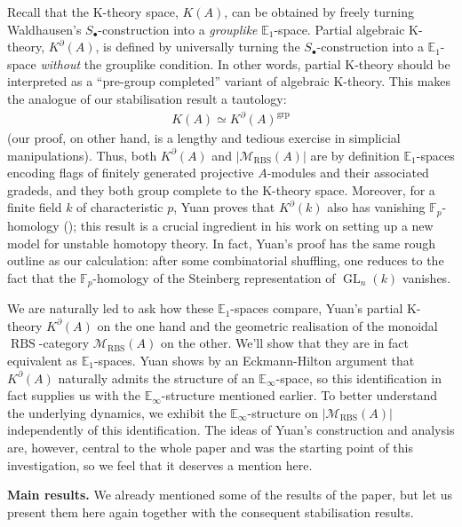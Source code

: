 \documentclass[12pt, reqno]{amsart}
\theoremstyle{plain}
\theoremstyle{definition}
\newcommand{\F}{\mathbb F}
\begin{document}
Recall that the K-theory space, $K(A)$, can be obtained by freely turning Waldhausen's $S_\bullet$-construction into a \textit{grouplike} $\mathbb{E}_1$-space. Partial algebraic K-theory, $K^\partial(A)$, is defined by universally turning the $S_\bullet$-construction into a $\mathbb{E}_1$-space \textit{without} the grouplike condition. In other words, partial K-theory should be interpreted as a ``pre-group completed'' variant of algebraic K-theory. This makes the analogue of our stabilisation result a tautology:
\begin{align*}
K(A)\simeq K^\partial(A)^{\operatorname{grp}}
\end{align*}
(our proof, on other hand, is a lengthy and tedious exercise in simplicial manipulations). Thus, both $K^\partial(A)$ and $|\mathscr{M}_{\operatorname{RBS}}(A)|$ are by definition $\mathbb{E}_1$-spaces encoding flags of finitely generated projective $A$-modules and their associated gradeds, and they both group complete to the K-theory space. Moreover, for a finite field $k$ of characteristic $p$, Yuan proves that $K^\partial(k)$ also has vanishing $\F_p$-homology (\cite[Theorem 5.2]{Yuan}); this result is a crucial ingredient in his work on setting up a new model for unstable homotopy theory. In fact, Yuan's proof has the same rough outline as our calculation: after some combinatorial shuffling, one reduces to the fact that the $\F_p$-homology of the Steinberg representation of $\operatorname{GL}_n(k)$ vanishes.

We are naturally led to ask how these $\mathbb{E}_1$-spaces compare, Yuan's partial K-theory $K^\partial(A)$ on the one hand and the geometric realisation of the monoidal $\operatorname{RBS}$-category $\mathscr{M}_{\operatorname{RBS}}(A)$ on the other. We'll show that they are in fact equivalent as $\mathbb{E}_1$-spaces. Yuan shows by an Eckmann-Hilton argument that $K^\partial(A)$ naturally admits the structure of an $\mathbb{E}_\infty$-space, so this identification in fact supplies us with the $\mathbb{E}_\infty$-structure mentioned earlier. To better understand the underlying dynamics, we exhibit the $\mathbb{E}_\infty$-structure on $|\mathscr{M}_{\operatorname{RBS}}(A)|$ independently of this identification. The ideas of Yuan's construction and analysis are, however, central to the whole paper and was the starting point of this investigation, so we feel that it deserves a mention here.

\medskip

\textbf{Main results.} We already mentioned some of the results of the paper, but let us present them here again together with the consequent stabilisation results.
\end{document}
